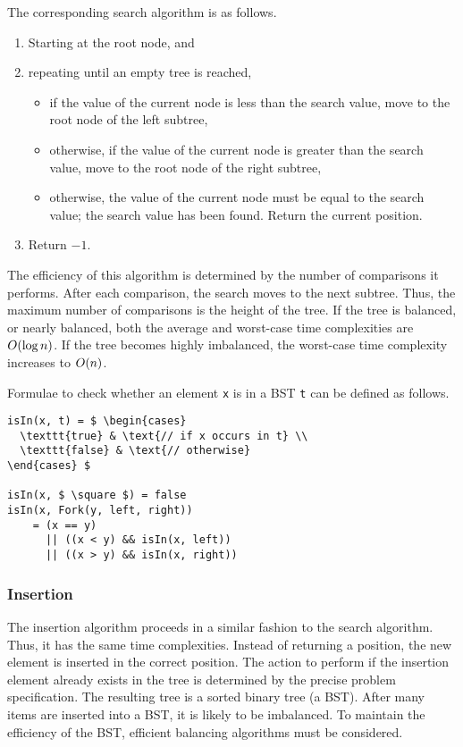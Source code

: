 The corresponding search algorithm is as follows.
\begin{enumerate}
  \item Starting at the root node, and
  \item repeating until an empty tree is reached,
  \begin{itemize}
    \item if the value of the current node is less than the search value, move to the root node of the left subtree,
    \item otherwise, if the value of the current node is greater than the search value, move to the root node of the right subtree,
    \item otherwise, the value of the current node must be equal to the search value; the search value has been found.
    Return the current position.
  \end{itemize}
  \item Return \( -1 \).
\end{enumerate}

The efficiency of this algorithm is determined by the number of comparisons it performs.
After each comparison, the search moves to the next subtree.
Thus, the maximum number of comparisons is the height of the tree.
If the tree is balanced, or nearly balanced, both the average and worst-case time complexities are \( O\!\left(\log n\right) \).
If the tree becomes highly imbalanced, the worst-case time complexity increases to \( O\!\left(n\right) \).

Formulae to check whether an element \texttt{x} is in a BST \texttt{t} can be defined as follows.
\begin{lstlisting}[mathescape=true]
isIn(x, t) = $ \begin{cases}
  \texttt{true} & \text{// if x occurs in t} \\
  \texttt{false} & \text{// otherwise}
\end{cases} $

isIn(x, $ \square $) = false
isIn(x, Fork(y, left, right))
    = (x == y)
      || ((x < y) && isIn(x, left))
      || ((x > y) && isIn(x, right))
\end{lstlisting}

\subsubsection{Insertion}

The insertion algorithm proceeds in a similar fashion to the search algorithm.
Thus, it has the same time complexities.
Instead of returning a position, the new element is inserted in the correct position.
The action to perform if the insertion element already exists in the tree is determined by the precise problem specification.
The resulting tree is a sorted binary tree (a BST).
After many items are inserted into a BST, it is likely to be imbalanced.
To maintain the efficiency of the BST, efficient balancing algorithms must be considered.

